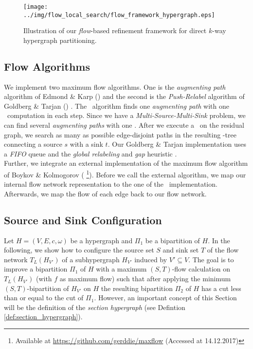 \begin{figure}
\centering 
\texttt{[image: ../img/flow\_local\_search/flow\_framework\_hypergraph.eps]}
\caption{Illustration of our \emph{flow}-based refinement framework for direct $k$-way hypergraph
         partitioning.}
\label{img:flow_framework}
\end{figure} 

\subsection{Flow Algorithms}
\label{sec:flow_algo_implementation}

We implement two maximum flow algorithms.
One is the \emph{augmenting path} algorithm of Edmond \& Karp (\EdmondKarp)
\cite{edmonds1972theoretical} 
and the second is the \emph{Push-Relabel} algorithm of
Goldberg \& Tarjan (\GoldbergTarjan) \cite{cherkassky1997implementing,goldberg1988new}. 
The \EdmondKarp~algorithm finds one \emph{augmenting path} with one \BFS~computation in each step.
Since we have a \emph{Multi-Source-Multi-Sink} problem, we can find several \emph{augmenting paths}
with one \BFS. After we execute a \BFS~on the residual graph, we search 
as many as possible edge-disjoint paths in the resulting \BFS-tree connecting a source $s$
with a sink $t$. Our Goldberg \& Tarjan implementation uses a \emph{FIFO} queue and
the \emph{global relabeling} and \emph{gap} heuristic \cite{cherkassky1997implementing}. \\
Further, we integrate an external implementation of the maximum flow algorithm of 
Boykov \& Kolmogorov \cite{boykov2004experimental} (\BoykovKolmogorov
\footnote{Available at \url{https://github.com/gerddie/maxflow} (Accessed at 14.12.2017)}).
Before we call the external algorithm, we map our internal flow network representation to
the one of the \BoykovKolmogorov~implementation. Afterwards, we map the flow of each edge back
to our flow network.


\subsection{Source and Sink Configuration}
\label{sec:source_and_sink}

Let $H = (V,E,c,\omega)$ be a hypergraph and $\Pi_1$ be a bipartition of $H$.
In the following, we show how to configure the source set $S$ and sink set $T$ of the flow
network $T_L(H_{V'})$ of a subhypergraph $H_{V'}$ induced by $V' \subseteq V$. The goal is 
to improve a bipartition $\Pi_1$ of $H$ with a maximum $(S,T)$-flow calculation 
on $T_L(H_{V'})$ (with $f$ as maximum flow) such that after applying the minimum 
$(S,T)$-bipartition of $H_{V'}$ on $H$ the resulting bipartition $\Pi_2$ of $H$ has a 
cut less than or equal to the cut of $\Pi_1$. However, an important concept of this Section will
be the definition of the \emph{section hypergraph} (see Defintion
\ref{def:section_hypergraph}). 

